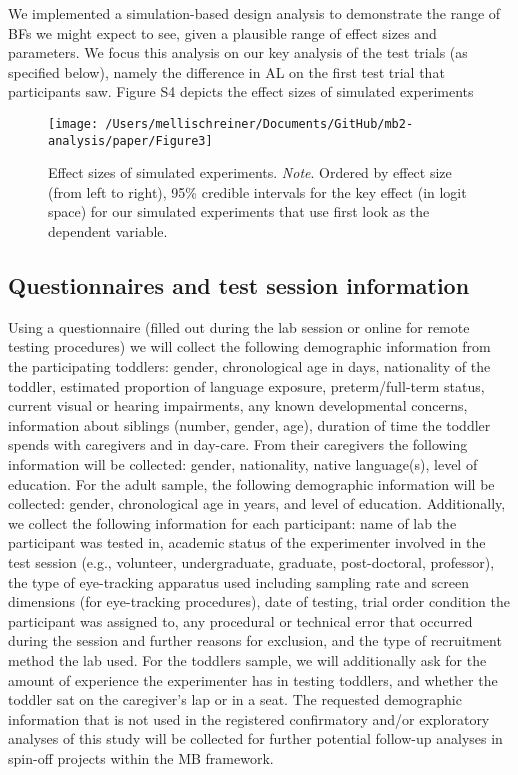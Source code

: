 \documentclass[
  man, donotrepeattitle,floatsintext]{apa6}
\begin{document}
We implemented a simulation-based design analysis to demonstrate the range of BFs we might expect to see, given a plausible range of effect sizes and parameters. We focus this analysis on our key analysis of the test trials (as specified below), namely the difference in AL on the first test trial that participants saw. Figure S4 depicts the effect sizes of simulated experiments

\begin{figure}

\texttt{[image: /Users/mellischreiner/Documents/GitHub/mb2-analysis/paper/Figure3]} \hfill{}

\caption{Effect sizes of simulated experiments. \newline{} \textit{Note}. Ordered by effect size (from left to right), 95\% credible intervals for the key effect (in logit space) for our simulated experiments that use first look as the dependent variable.}\label{fig:figS4}
\end{figure}

\subsection{Questionnaires and test session information}\label{questionnaires-and-test-session-information}

Using a questionnaire (filled out during the lab session or online for remote testing procedures) we will collect the following demographic information from the participating toddlers: gender, chronological age in days, nationality of the toddler, estimated proportion of language exposure, preterm/full-term status, current visual or hearing impairments, any known developmental concerns, information about siblings (number, gender, age), duration of time the toddler spends with caregivers and in day-care. From their caregivers the following information will be collected: gender, nationality, native language(s), level of education. For the adult sample, the following demographic information will be collected: gender, chronological age in years, and level of education.
Additionally, we collect the following information for each participant: name of lab the participant was tested in, academic status of the experimenter involved in the test session (e.g., volunteer, undergraduate, graduate, post-doctoral, professor), the type of eye-tracking apparatus used including sampling rate and screen dimensions (for eye-tracking procedures), date of testing, trial order condition the participant was assigned to, any procedural or technical error that occurred during the session and further reasons for exclusion, and the type of recruitment method the lab used. For the toddlers sample, we will additionally ask for the amount of experience the experimenter has in testing toddlers, and whether the toddler sat on the caregiver's lap or in a seat. The requested demographic information that is not used in the registered confirmatory and/or exploratory analyses of this study will be collected for further potential follow-up analyses in spin-off projects within the MB framework.
\end{document}
